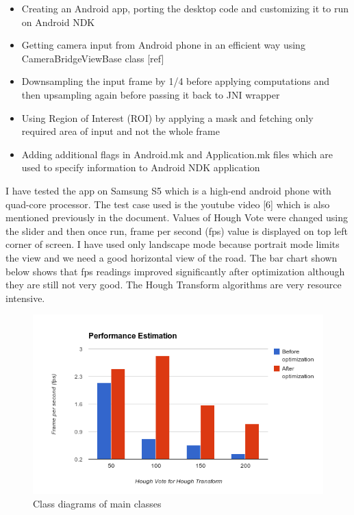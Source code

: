 \begin{itemize}
        \item Creating an Android app, porting the desktop code and customizing it to run on Android NDK
        \item Getting camera input from Android phone in an efficient way using CameraBridgeViewBase class [ref]
        \item Downsampling the input frame by 1/4 before applying computations and then upsampling again before passing it back to JNI wrapper
        \item Using Region of Interest (ROI) by applying a mask and fetching only required area of input and not the whole frame
        \item Adding additional flags in Android.mk and Application.mk files which are used to specify information to Android NDK application
\end{itemize}

I have tested the app on Samsung S5 which is a high-end android phone with quad-core processor. The test case used is the youtube video [6] which is also mentioned previously in the document. Values of Hough Vote were changed using the slider and then once run, frame per second (fps) value is displayed on top left corner of screen. I have used only landscape mode because portrait mode limits the view and we need a good horizontal view of the road. The bar chart shown below shows that fps readings improved significantly after optimization although they are still not very good. The Hough Transform algorithms are very resource intensive. 

\begin{figure}[H]
\begin{center}
    \includegraphics[scale=0.6]{img/lane15.png}
\end{center}
\caption{Class diagrams of main classes}
\end{figure}

